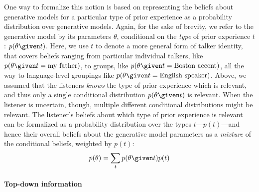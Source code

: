 One way to formalize this notion is based on representing the beliefs about generative models for a particular type of prior experience as a probability distribution over generative models.  Again, for the sake of brevity, we refer to the generative model by its parameters%
 $\theta$, conditional on the \emph{type} of prior experience $t$: $p(\theta\given t)$.  Here, we use $t$ to denote a more general form of talker identity, that covers beliefs ranging from particular individual talkers, like $p(\theta \given t=\mathrm{my\ father})$, to groups, like $p(\theta \given t=\textrm{Boston accent})$, all the way to language-level groupings like $p(\theta \given t=\textrm{English speaker})$.  Above, we assumed that the listeners \emph{knows} the type of prior experience which is relevant, and thus only a single conditional distribution $p(\theta \given t)$ is relevant.  When the listener is uncertain, though, multiple different conditional distributions might be relevant.  The listener's beliefs about which type of prior experience is relevant can be formalized as a probability distribution over the types $t$---$p(t)$---and hence their overall beliefs about the generative model parameters as a \emph{mixture} of the conditional beliefs, weighted by $p(t)$: 
\begin{equation}
  \label{eq:30}
  p(\theta) = \sum_t p(\theta \given t) p(t)
\end{equation}

\paragraph{Top-down information}
\label{sec:top-down-information}

